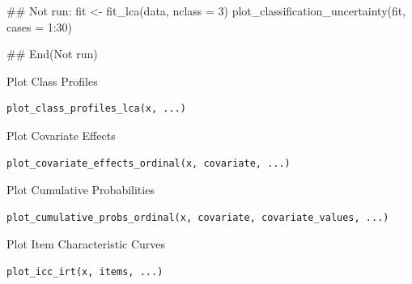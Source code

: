 \documentclass[a4paper]{book}
\begin{document}
%
\begin{Examples}
\begin{ExampleCode}
## Not run: 
fit <- fit_lca(data, nclass = 3)
plot_classification_uncertainty(fit, cases = 1:30)

## End(Not run)

\end{ExampleCode}
\end{Examples}
%
\begin{Description}
Plot Class Profiles
\end{Description}
%
\begin{Usage}
\begin{verbatim}
plot_class_profiles_lca(x, ...)
\end{verbatim}
\end{Usage}
%
\begin{Description}
Plot Covariate Effects
\end{Description}
%
\begin{Usage}
\begin{verbatim}
plot_covariate_effects_ordinal(x, covariate, ...)
\end{verbatim}
\end{Usage}
%
\begin{Description}
Plot Cumulative Probabilities
\end{Description}
%
\begin{Usage}
\begin{verbatim}
plot_cumulative_probs_ordinal(x, covariate, covariate_values, ...)
\end{verbatim}
\end{Usage}
%
\begin{Description}
Plot Item Characteristic Curves
\end{Description}
%
\begin{Usage}
\begin{verbatim}
plot_icc_irt(x, items, ...)
\end{verbatim}
\end{Usage}
\end{document}

